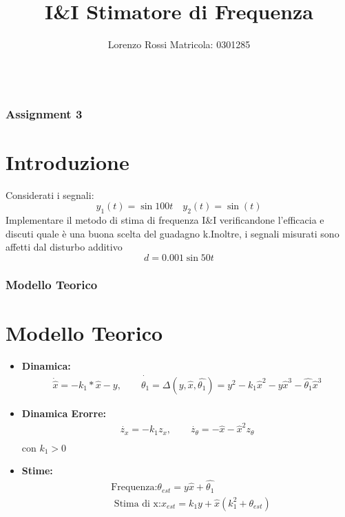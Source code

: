\documentclass{beamer}
\title[Assignments 3]{I\&I Stimatore di Frequenza}
\author{Lorenzo Rossi Matricola: 0301285}
\begin{document}
\begin{frame}
	\titlepage{}
\end{frame}
\begin{frame}
	\begin{columns}[t]
		\begin{column}{.5\textwidth}
			\tableofcontents[sections={1-3}] %
		\end{column}
		\begin{column}{.5\textwidth}
			\tableofcontents[sections={4-5}] %
		\end{column}
	\end{columns}
\end{frame}
\begin{frame}
    \frametitle{Assignment 3}
    \section{Introduzione}
    Considerati i segnali:\begin{equation*}
        y_1(t)=\sin{100 t}\quad y_2(t)=\sin(t)
    \end{equation*}
    Implementare il metodo di stima di frequenza I\&I verificandone l'efficacia e discuti quale è una buona scelta del guadagno k.\newline Inoltre, i segnali misurati sono affetti dal disturbo additivo \begin{equation*}
        d=0.001 \sin{50 t}
    \end{equation*}
\end{frame}
\begin{frame}
    \frametitle{Modello Teorico}
    \section{Modello Teorico}
    \begin{itemize}
        \item \textbf{Dinamica:}\begin{align*}
            \dot{\hat{x}}=-k_{1}*\hat{x}-y,\quad\quad \dot{\hat{\theta_{1}}}=\Delta(y,\hat{x},\hat{\theta_{1}})=y^2-k_{1}\hat{x}^2-y\hat{x}^3-\hat{\theta_{1}}\hat{x}^3
        \end{align*}
        \item \textbf{Dinamica Erorre:}
        \begin{align*}
            \dot{z_{x}}=-k_{1}z_{x},\quad\quad \dot{z_{\theta}}=-\hat{x}-\hat{x}^{2}z_{\theta}\\
        \end{align*}
        con \(k_{1}>0\)
        \item \textbf{Stime:}
         \begin{align*}
            &\text{Frequenza:}\theta_{est}=y\hat{x}+\hat{\theta_{1}}\\
            &\text{ Stima di x:} x_{est}=k_{1}y+\hat{x}(k_{1}^{2}+\theta_{est})
        \end{align*}
    \end{itemize}
\end{frame}
\end{document}
